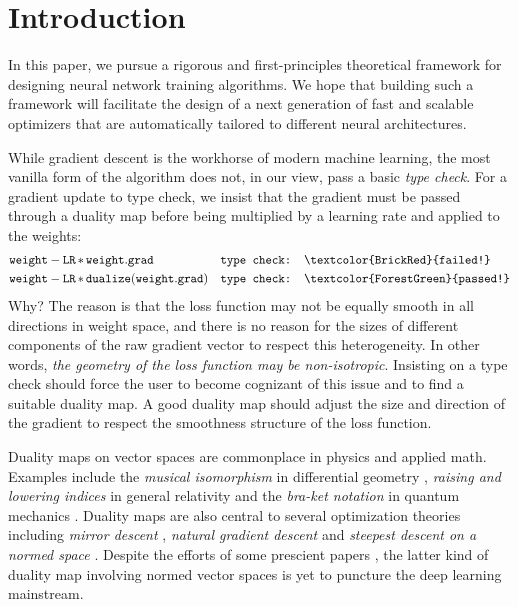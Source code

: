\section{Introduction}

In this paper, we pursue a rigorous and first-principles theoretical framework for designing neural network training algorithms. We hope that building such a framework will facilitate the design of a next generation of fast and scalable optimizers that are automatically tailored to different neural architectures.

While gradient descent is the workhorse of modern machine learning, the most vanilla form of the algorithm does not, in our view, pass a basic \textit{type check}. For a gradient update to type check, we insist that the gradient must be passed through a duality map before being multiplied by a learning rate and applied to the weights:
\begin{align}
    &\mathtt{weight} - \mathtt{LR}\,\mathtt{*}\,\mathtt{weight.grad} &&\texttt{type check: \textcolor{BrickRed}{failed!}}\\
    &\mathtt{weight} - \mathtt{LR}\,\mathtt{*}\,\mathtt{dualize}(\mathtt{weight.grad}) &&\texttt{type check: \textcolor{ForestGreen}{passed!}}
\end{align}
Why? The reason is that the loss function may not be equally smooth in all directions in weight space, and there is no reason for the sizes of different components of the raw gradient vector to respect this heterogeneity. In other words, \textit{the geometry of the loss function may be non-isotropic}. Insisting on a type check should force the user to become cognizant of this issue and to find a suitable duality map. A good duality map should adjust the size and direction of the gradient to respect the smoothness structure of the loss function.

Duality maps on vector spaces are commonplace in physics and applied math. Examples include the \textit{musical isomorphism} in differential geometry \citep{grosse2022metrics}, \textit{raising and lowering indices} in general relativity \citep{carroll2019spacetime} and the \textit{bra-ket notation} in quantum mechanics \citep{sakurai2020modern}. Duality maps are also central to several optimization theories including \textit{mirror descent} \citep{nemirovsky_yudin_1983}, \textit{natural gradient descent} \citep{amari2016information} and \textit{steepest descent on a normed space} \citep{Boyd_Vandenberghe_2004}. Despite the efforts of some prescient papers \citep{spectral-descent-4,flynn2017duality}, the latter kind of duality map involving normed vector spaces is yet to puncture the deep learning mainstream.

